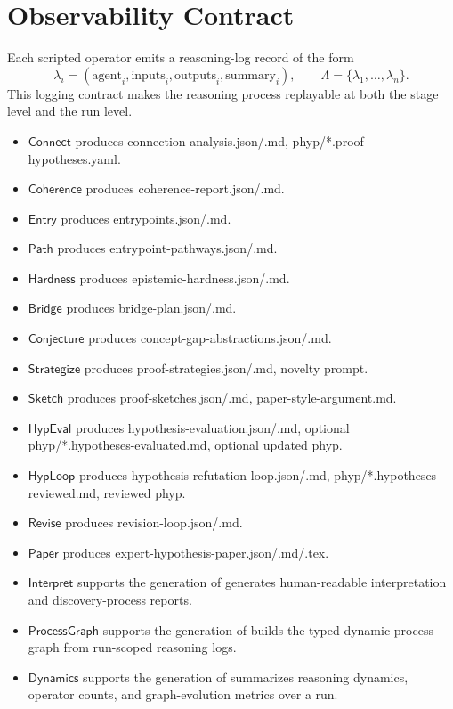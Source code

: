 \documentclass[11pt]{article}
\begin{document}
\section{Observability Contract}
Each scripted operator emits a reasoning-log record of the form
\[
\lambda_i = (\mathrm{agent}_i, \mathrm{inputs}_i, \mathrm{outputs}_i, \mathrm{summary}_i), \qquad \Lambda = \{\lambda_1, \ldots, \lambda_n\}.
\]
This logging contract makes the reasoning process replayable at both the stage level and the run level.
\begin{itemize}[leftmargin=*,itemsep=0.2em]
\item $\mathsf{Connect}$ produces connection-analysis.json/.md, phyp/*.proof-hypotheses.yaml.
\item $\mathsf{Coherence}$ produces coherence-report.json/.md.
\item $\mathsf{Entry}$ produces entrypoints.json/.md.
\item $\mathsf{Path}$ produces entrypoint-pathways.json/.md.
\item $\mathsf{Hardness}$ produces epistemic-hardness.json/.md.
\item $\mathsf{Bridge}$ produces bridge-plan.json/.md.
\item $\mathsf{Conjecture}$ produces concept-gap-abstractions.json/.md.
\item $\mathsf{Strategize}$ produces proof-strategies.json/.md, novelty prompt.
\item $\mathsf{Sketch}$ produces proof-sketches.json/.md, paper-style-argument.md.
\item $\mathsf{HypEval}$ produces hypothesis-evaluation.json/.md, optional phyp/*.hypotheses-evaluated.md, optional updated phyp.
\item $\mathsf{HypLoop}$ produces hypothesis-refutation-loop.json/.md, phyp/*.hypotheses-reviewed.md, reviewed phyp.
\item $\mathsf{Revise}$ produces revision-loop.json/.md.
\item $\mathsf{Paper}$ produces expert-hypothesis-paper.json/.md/.tex.
\item $\mathsf{Interpret}$ supports the generation of generates human-readable interpretation and discovery-process reports.
\item $\mathsf{ProcessGraph}$ supports the generation of builds the typed dynamic process graph from run-scoped reasoning logs.
\item $\mathsf{Dynamics}$ supports the generation of summarizes reasoning dynamics, operator counts, and graph-evolution metrics over a run.
\end{itemize}
\end{document}
